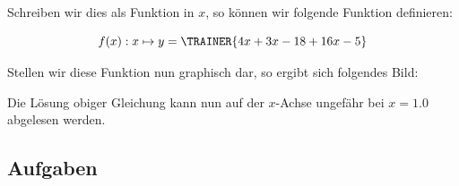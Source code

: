 Schreiben wir dies als Funktion in $x$, so können wir folgende
Funktion definieren:

$$f(x): x \mapsto y = \TRAINER{4x+3x-18+16x - 5}$$

Stellen wir diese Funktion nun graphisch dar, so ergibt sich folgendes
Bild:



Die Lösung obiger Gleichung kann nun auf der $x$-Achse ungefähr bei $x=1.0$ abgelesen werden.
\newpage

\subsection*{Aufgaben}
\newpage

\GESO{\newpage }
\newpage%
